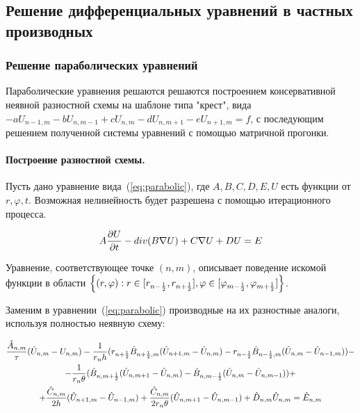 \subsection{Решение дифференциальных уравнений в частных производных}
\subsubsection{Решение параболических уравнений}\label{sec:parabolic-scheme}
Параболические уравнения решаются решаются построением консервативной неявной 
разностной схемы на шаблоне типа "крест", вида $-aU_{n-1,m} - bU_{n,m-1} + 
cU_{n,m} - dU_{n,m+1} - eU_{n+1,m} = f$, с последующим решением полученной 
системы уравнений с помощью матричной прогонки.

\paragraph{Построение разностной схемы.}
Пусть дано уравнение вида~(\ref{eq:parabolic}), где $A,B,C,D,E,U$ есть функции 
от $r, \varphi, t$. 
Возможная нелинейность будет разрешена с помощью итерационного процесса.

\begin{equation}
    A\frac{\partial U}{\partial t} - div(B \nabla U) + C \nabla U + D U = E
    \label{eq:parabolic}
\end{equation}

Уравнение, соответствующее точке $(n,m)$, описывает поведение искомой функции в 
области $\left\{(r, \varphi) : r \in [r_{n-\frac{1}{2}}, r_{n+\frac{1}{2}}], \varphi \in 
[\varphi_{m-\frac{1}{2}}, \varphi_{m+\frac{1}{2}}]\right\}$.

Заменим в уравнении~(\ref{eq:parabolic}) производные на их разностные аналоги, 
используя полностью неявную схему:

\begin{gather*}
    \frac{\hat{A}_{n,m}}{\tau}
    (\hat{U}_{n,m} - U_{n,m})
    - \frac{1}{r_n h} 
    (
    r_{n+\frac{1}{2}}\hat{B}_{n+\frac{1}{2},m}
    (\hat{U}_{n+1,m} - \hat{U}_{n,m})
    -
    r_{n-\frac{1}{2}}\hat{B}_{n-\frac{1}{2},m}
    (\hat{U}_{n,m} - \hat{U}_{n-1,m})
    )
    -\\
    - \frac{1}{r_n \theta}
    (
    \hat{B}_{n,m+\frac{1}{2}}
    (\hat{U}_{n,m+1} - \hat{U}_{n,m})
    -
    \hat{B}_{n,m-\frac{1}{2}}
    (\hat{U}_{n,m} - \hat{U}_{n,m-1})
    )
    +\\
    + \frac{\hat{C}_{n,m}}{2h} (\hat{U}_{n+1,m} - \hat{U}_{n-1,m})
    + \frac{\hat{C}_{n,m}}{2r_n \theta} (\hat{U}_{n,m+1} - \hat{U}_{n,m-1})
    + \hat{D}_{n,m} \hat{U}_{n,m}
    = \hat{E}_{n,m}
\end{gather*}

